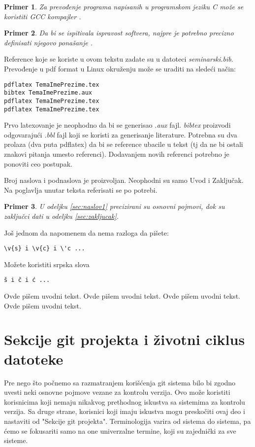 \documentclass[a4paper]{article}
\newtheorem{primer}{Primer}[section]
\begin{document}
{\begin{primer}
Za prevođenje programa napisanih u programskom jeziku C može se koristiti GCC kompajler \cite{gcc}.
\end{primer}

\begin{primer}
 Da bi se ispitivala ispravost softvera, najpre je potrebno precizno definisati njegovo ponašanje \cite{laski2009software}. 
\end{primer}

Reference koje se koriste u ovom tekstu zadate su u datoteci {\em seminarski.bib}. Prevođenje u pdf format u Linux okruženju može se uraditi na sledeći način:
\begin{verbatim}
pdflatex TemaImePrezime.tex 
bibtex TemaImePrezime.aux 
pdflatex TemaImePrezime.tex 
pdflatex TemaImePrezime.tex 
\end{verbatim}
Prvo latexovanje je neophodno da bi se generisao {\em .aux} fajl. {\em bibtex} proizvodi odgovarajući {\em .bbl} fajl koji se koristi za generisanje literature. 
Potrebna su dva prolaza (dva puta pdflatex) da bi se reference ubacile u tekst (tj da ne bi ostali znakovi pitanja umesto referenci). Dodavanjem novih referenci potrebno je ponoviti ceo postupak.  


Broj naslova i podnaslova je proizvoljan. Neophodni su samo Uvod i Zaključak. Na poglavlja unutar teksta referisati se po potrebi. 
\begin{primer}
U odeljku \ref{sec:naslov1} precizirani su osnovni pojmovi, dok su zaključci dati u odeljku \ref{sec:zakljucak}.
\end{primer}

Još jednom da napomenem da nema razloga da pišete:
\begin{verbatim}
\v{s} i \v{c} i \'c ...
\end{verbatim}
Možete koristiti srpska slova
\begin{verbatim}
š i č i ć ... 
\end{verbatim}


Ovde pišem uvodni tekst.
Ovde pišem uvodni tekst. 
Ovde pišem uvodni tekst. 
Ovde pišem uvodni tekst. 


\section{Sekcije git projekta i životni ciklus datoteke}
\label{zivotni_ciklus}
Pre nego što počnemo sa razmatranjem korišćenja git sistema bilo bi zgodno uvesti neki osnovne pojmove vezane za kontrolu verzija. Ovo može koristiti korisnicima koji nemaju nikakvog prethodnog iskustva sa sistemima za kontrolu verzija. Sa druge strane, korisnici koji imaju iskustva mogu preskočiti ovaj deo i nastaviti od "Sekcije git projekta". Terminologija varira od sistema do sistema, pa ćemo se fokusariti samo na one univerzalne termine, koji su zajednički za sve sisteme.

}
\end{document}
